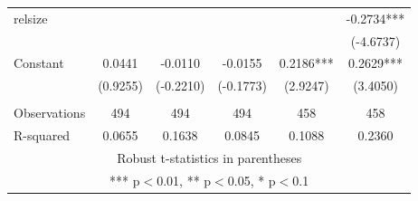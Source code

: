 \documentclass[12pt]{article}
\begin{document}
\begin{adjustbox}{max width=\textwidth}
\begin{tabular}{lccccc}
   relsize &  &  &  &  & -0.2734*** \\
	&  &  &  &  & (-4.6737) \\
   Constant & 0.0441 & -0.0110 & -0.0155 & 0.2186*** & 0.2629*** \\
	& (0.9255) & (-0.2210) & (-0.1773) & (2.9247) & (3.4050) \\
	&  &  &  &  &  \\
   Observations & 494 & 494 & 494 & 458 & 458 \\
	R-squared & 0.0655 & 0.1638 & 0.0845 & 0.1088 & 0.2360 \\ \hline
   \multicolumn{6}{c}{ Robust t-statistics in parentheses} \\
   \multicolumn{6}{c}{ *** p$<$0.01, ** p$<$0.05, * p$<$0.1} \\
   \end{tabular}
\end{adjustbox}
\end{document}
